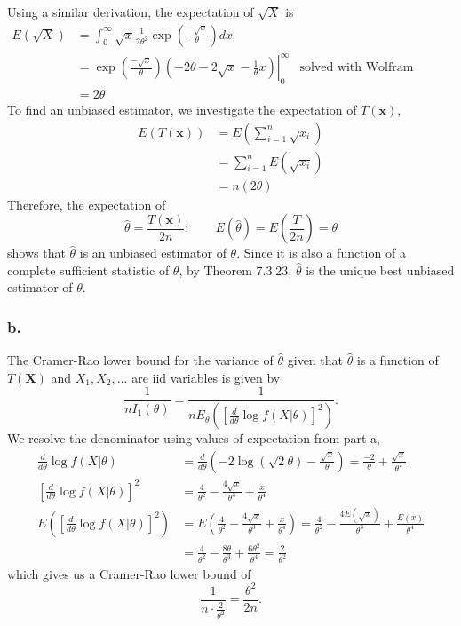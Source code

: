 \documentclass{article}
\begin{document}
Using a similar derivation, the expectation of $\sqrt{X}$ is
\begin{align*}
E(\sqrt{X}) &= \int_0^\infty \sqrt{x}\frac{1}{2\theta^2}\exp{\left(\frac{-\sqrt{x}}{\theta}\right)} dx \\
&=\left.\exp{\left(\frac{-\sqrt{x}}{\theta}\right)}\left(-2\theta-2\sqrt{x}-\frac{1}{\theta}x\right)\right|_0^\infty &\text{solved with Wolfram Alpha} \\
&=2\theta
\end{align*}
To find an unbiased estimator, we investigate the expectation of $T(\mathbf{x})$,
\begin{align*}
E\left(T(\mathbf{x})\right) &= E\left(\sum_{i=1}^n\sqrt{x_i}\right) \\
&=\sum_{i=1}^n E\left(\sqrt{x_i}\right) \\
&=n(2\theta)
\end{align*}
Therefore, the expectation of \[\hat{\theta} = \frac{T(\mathbf{x})}{2n};\qquad E(\hat{\theta}) = E\left(\frac{T}{2n}\right) = \theta\] shows that $\hat{\theta}$ is an unbiased estimator of $\theta$. Since it is also a function of a complete sufficient statistic of $\theta$, by Theorem 7.3.23, $\hat{\theta}$ is the unique best unbiased estimator of $\theta$.
\pagebreak
\subsubsection*{b.}
The Cramer-Rao lower bound for the variance of $\hat{\theta}$ given that $\hat{\theta}$ is a function of $T(\mathbf{X})$ and $X_1, X_2, ...$ are iid variables is given by 
\[\frac{1}{nI_1(\theta)} = \frac{1}{nE_\theta\left(\left[\frac{d}{d\theta}\log f(X|\theta)\right]^2\right)}.\]
We resolve the denominator using values of expectation from part a, 
\begin{align*}
\frac{d}{d\theta}\log f(X|\theta) &= \frac{d}{d\theta}\left(-2\log(\sqrt{2}\theta)-\frac{\sqrt{x}}{\theta}\right) = \frac{-2}{\theta}+\frac{\sqrt{x}}{\theta^2} \\
\left[\frac{d}{d\theta}\log f(X|\theta)\right]^2 &= \frac{4}{\theta^2}-\frac{4\sqrt{x}}{\theta^3}+\frac{x}{\theta^4} \\
E\left(\left[\frac{d}{d\theta}\log f(X|\theta)\right]^2\right) &= E\left(\frac{4}{\theta^2}-\frac{4\sqrt{x}}{\theta^3}+\frac{x}{\theta^4}\right) = \frac{4}{\theta^2}-\frac{4E(\sqrt{x})}{\theta^3}+\frac{E(x)}{\theta^4} \\
&=\frac{4}{\theta^2} - \frac{8\theta}{\theta^3}+\frac{6\theta^2}{\theta^4} = \frac{2}{\theta^2}
\end{align*}
which gives us a Cramer-Rao lower bound of 
\[\frac{1}{n\cdot\frac{2}{\theta^2}} = \frac{\theta^2}{2n}.\]
\end{document}
